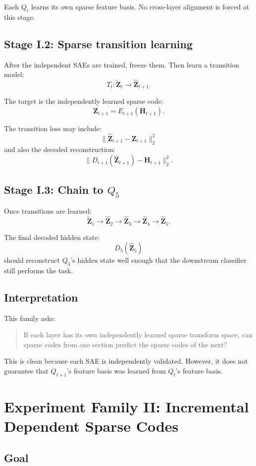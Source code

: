 \documentclass[11pt]{article}
\newcommand{\Htens}{\mathbf{H}}
\newcommand{\Ztens}{\mathbf{Z}}
\newcommand{\Zhat}{\widehat{\mathbf{Z}}}
\newcommand{\Ztilde}{\widetilde{\mathbf{Z}}}
\begin{document}
Each \(Q_t\) learns its own sparse feature basis. No cross-layer alignment is forced at this stage.

\subsection{Stage I.2: Sparse transition learning}

After the independent SAEs are trained, freeze them. Then learn a transition model:
\[
T_t:
\Ztilde_t
\rightarrow
\Zhat_{t+1}.
\]

The target is the independently learned sparse code:
\[
\Ztens_{t+1}=E_{t+1}(\Htens_{t+1}).
\]

The transition loss may include:
\[
\|\Zhat_{t+1}-\Ztens_{t+1}\|_2^2
\]
and also the decoded reconstruction:
\[
\|D_{t+1}(\Zhat_{t+1}) - \Htens_{t+1}\|_2^2.
\]

\subsection{Stage I.3: Chain to \(Q_5\)}

Once transitions are learned:
\[
\Ztilde_1
\rightarrow
\Zhat_2
\rightarrow
\Zhat_3
\rightarrow
\Zhat_4
\rightarrow
\Zhat_5.
\]

The final decoded hidden state:
\[
D_5(\Zhat_5)
\]
should reconstruct \(Q_5\)'s hidden state well enough that the downstream classifier still performs the task.

\subsection{Interpretation}

This family asks:
\begin{quote}
If each layer has its own independently learned sparse transform space, can sparse codes from one section predict the sparse codes of the next?
\end{quote}

This is clean because each SAE is independently validated. However, it does not guarantee that \(Q_{t+1}\)'s feature basis was learned from \(Q_t\)'s feature basis.

\section{Experiment Family II: Incremental Dependent Sparse Codes}

\subsection{Goal}
\end{document}
